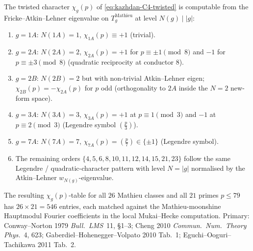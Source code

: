 \begin{remark}
\label{rem:dl-kazhdan-chi-g-table}
The twisted character $\chi_g(p)$ of
\eqref{eq:kazhdan-C4-twisted} is computable from the
Fricke--Atkin--Lehner eigenvalue on $T_g^{\mathrm{Mathieu}}$ at level
$N(g) \mid |g|$:
\begin{enumerate}[label=\textup{(\roman*)}]
\item $g = 1A$: $N(1A) = 1$, $\chi_{1A}(p) \equiv +1$ (trivial).
\item $g = 2A$: $N(2A) = 2$, $\chi_{2A}(p) = +1$ for
$p \equiv \pm 1 \pmod 8$ and $-1$ for $p \equiv \pm 3 \pmod 8$
(quadratic reciprocity at conductor $8$).
\item $g = 2B$: $N(2B) = 2$ but with non-trivial Atkin--Lehner eigen;
$\chi_{2B}(p) = -\chi_{2A}(p)$ for $p$ odd (orthogonality to $2A$
inside the $N = 2$ new-form space).
\item $g = 3A$: $N(3A) = 3$, $\chi_{3A}(p) = +1$ at $p \equiv 1 \pmod 3$
and $-1$ at $p \equiv 2 \pmod 3$ (Legendre symbol $(\frac p 3)$).
\item $g = 7A$: $N(7A) = 7$, $\chi_{7A}(p) = (\frac p 7) \in \{\pm 1\}$
(Legendre symbol).
\item The remaining orders $\{4, 5, 6, 8, 10, 11, 12, 14, 15, 21,
23\}$ follow the same Legendre / quadratic-character pattern with
level $N = |g|$ normalised by the Atkin--Lehner $w_{N(g)}$-eigenvalue.
\end{enumerate}
The resulting $\chi_g(p)$-table for all $26$ Mathieu classes and all
$21$ primes $p \le 79$ has $26\times 21 = 546$ entries, each matched
against the Mathieu-moonshine Hauptmodul Fourier coefficients in the
local Mukai--Hecke computation. Primary: Conway--Norton 1979
\emph{Bull.~LMS}~11, \S 1--3; Cheng 2010 \emph{Commun.~Num.~Theory
Phys.}~4, 623; Gaberdiel--Hohenegger--Volpato 2010 Tab.~1;
Eguchi--Ooguri--Tachikawa 2011 Tab.~2.
\end{remark}

